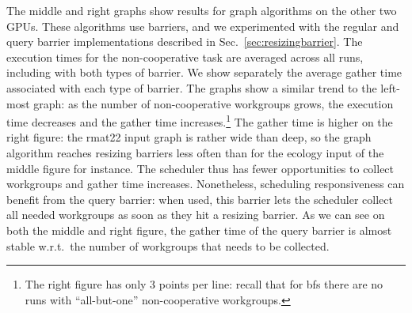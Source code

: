 \documentclass[numbers,nocopyrightspace,10pt]{sigplanconf}
\newcommand{\mysec}{Sec.~}
\begin{document}
The middle and right graphs show results for graph algorithms on the
other two GPUs.  These
algorithms use barriers, and we experimented with the regular and
query barrier implementations described in \mysec\ref{sec:resizingbarrier}.  The execution times for the non-cooperative task are averaged across all runs, including with both types of barrier.  We show separately the average gather time associated with each type of barrier.  The graphs show a similar trend to the left-most graph: as the number of non-cooperative workgroups grows, the
execution time decreases and the gather time increases.\footnote{The right
figure has only 3 points per line: recall that for bfs there are no runs
with ``all-but-one'' non-cooperative workgroups.}
%
The gather time is higher on the right figure: the rmat22 input graph is
rather wide than deep, so the graph algorithm reaches resizing barriers
less often than for the ecology input of the middle figure for
instance. The scheduler thus has fewer opportunities to collect
workgroups and gather time increases. Nonetheless, scheduling
responsiveness can benefit from the query barrier: when used, this
barrier lets the scheduler collect all needed workgroups as soon as they
hit a resizing barrier. As we can see on both the middle and right
figure, the gather time of the query barrier is almost stable w.r.t.\ the
number of workgroups that needs to be collected.
\end{document}
